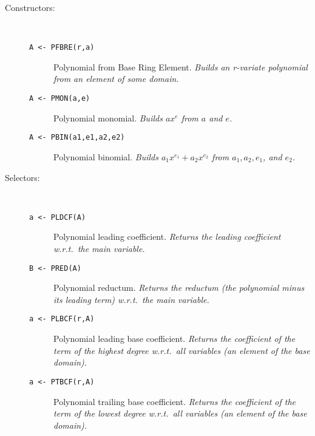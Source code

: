 \begin{description}
\item[Constructors:] \ \
  \begin{description}
  \item[{\tt A <- PFBRE(r,a) 
}]  Polynomial from Base Ring Element. {\em Builds an r-variate
    polynomial from an element of some domain.}
  \item[{\tt A <- PMON(a,e) 
}]  Polynomial monomial. {\em Builds $a x^e$ from $a$ and $e$.}
  \item[{\tt A <- PBIN(a1,e1,a2,e2) 
}]  Polynomial binomial. {\em Builds $a_1 x^{e_1} + a_2 x^{e_2}$
    from $a_1, a_2, e_1$, and $e_2$.}
  \end{description}

\item[Selectors:] \ \
  \begin{description}
  \item[{\tt a <- PLDCF(A) 
}]  Polynomial leading coefficient. {\em Returns the leading
    coefficient w.r.t.\ the main variable.}
  \item[{\tt B <- PRED(A) 
}]\index{PRED}  Polynomial reductum. {\em Returns the reductum (the
    polynomial minus its leading term) w.r.t.\ the main variable.}
  \item[{\tt a <- PLBCF(r,A) 
}]\index{PLBCF}  Polynomial leading base coefficient. {\em Returns the
    coefficient of the term of the highest degree w.r.t.\ all variables (an
    element of the base domain).}
  \item[{\tt a <- PTBCF(r,A) 
}]  Polynomial trailing base coefficient. {\em Returns the
    coefficient of the term of the lowest degree w.r.t.\ all variables (an
    element of the base domain).}
  \end{description}


\end{description}
